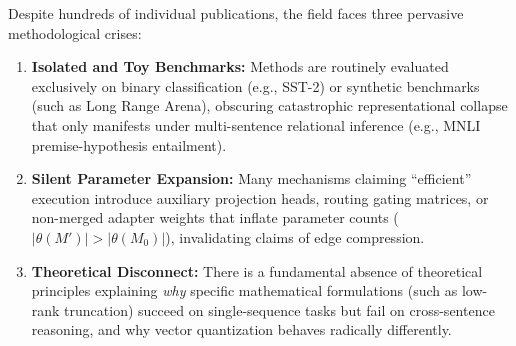 \documentclass{article}
\begin{document}
Despite hundreds of individual publications, the field faces three pervasive methodological crises:
\begin{enumerate}
    \item \textbf{Isolated and Toy Benchmarks:} Methods are routinely evaluated exclusively on binary classification (e.g., SST-2) or synthetic benchmarks (such as Long Range Arena), obscuring catastrophic representational collapse that only manifests under multi-sentence relational inference (e.g., MNLI premise-hypothesis entailment).
    \item \textbf{Silent Parameter Expansion:} Many mechanisms claiming ``efficient'' execution introduce auxiliary projection heads, routing gating matrices, or non-merged adapter weights that inflate parameter counts ($|\theta(M')| > |\theta(M_0)|$), invalidating claims of edge compression.
    \item \textbf{Theoretical Disconnect:} There is a fundamental absence of theoretical principles explaining \textit{why} specific mathematical formulations (such as low-rank truncation) succeed on single-sequence tasks but fail on cross-sentence reasoning, and why vector quantization behaves radically differently.
\end{enumerate}
\end{document}

